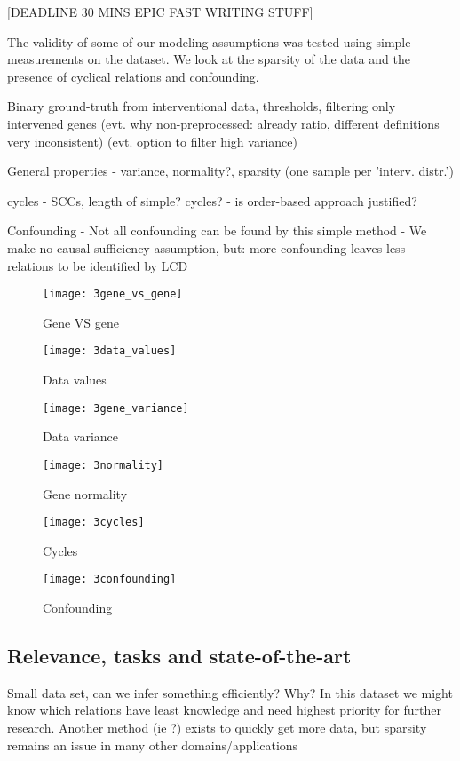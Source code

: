 [DEADLINE 30 MINS EPIC FAST WRITING STUFF]



The validity of some of our modeling assumptions was tested using simple measurements on the dataset. We look at the sparsity of the data and the presence of cyclical relations and confounding. 

Binary ground-truth from interventional data, thresholds, filtering only intervened genes
(evt. why non-preprocessed: already ratio, different definitions very inconsistent)
(evt. option to filter high variance)

General properties
- variance, normality?, sparsity (one sample per 'interv. distr.')

cycles
- SCCs, length of simple? cycles?
- is order-based approach justified?

Confounding
- Not all confounding can be found by this simple method
- We make no causal sufficiency assumption, but: more confounding leaves less relations to be identified by LCD

\begin{figure}[h]
    \centering
    \texttt{[image: 3gene\_vs\_gene]}
    \caption{Gene VS gene}
    \label{fig:3:genevsgene}
\end{figure}

\begin{figure}[h]
    \centering
    \texttt{[image: 3data\_values]}
    \caption{Data values}
    \label{fig:3:datavalues}
\end{figure}

\begin{figure}[h]
    \centering
    \texttt{[image: 3gene\_variance]}
    \caption{Data variance}
    \label{fig:3:datavariance}
\end{figure}

\begin{figure}[h]
    \centering
    \texttt{[image: 3normality]}
    \caption{Gene normality}
    \label{fig:3:normality}
\end{figure}    

\begin{figure}[h]
    \centering
    \texttt{[image: 3cycles]}
    \caption{Cycles}
    \label{fig:3:cycles}
\end{figure}    

\begin{figure}[h]
    \centering
    \texttt{[image: 3confounding]}
    \caption{Confounding}
    \label{fig:3:confounding}
\end{figure}    


\subsection{Relevance, tasks and state-of-the-art}
Small data set, can we infer something efficiently?
Why? In this dataset we might know which relations have least knowledge and need highest priority for further research.
Another method (ie ?) exists to quickly get more data, but sparsity remains an issue in many other domains/applications
